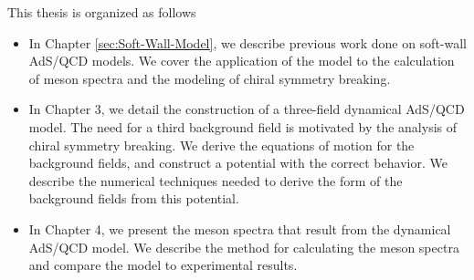 This thesis is organized as follows
\begin{itemize}

\item In Chapter \ref{sec:Soft-Wall-Model}, we describe previous work done on soft-wall AdS/QCD models. 
We cover the application of the model to the calculation of meson spectra and the modeling of chiral symmetry breaking.

\item In Chapter 3, we detail the construction of a three-field dynamical AdS/QCD model.
The need for a third background field is motivated by the analysis of chiral symmetry breaking. 
We derive the equations of motion for the background fields, and construct a potential with the correct behavior.
We describe the numerical techniques needed to derive the form of the background fields from this potential.

\item In Chapter 4, we present the meson spectra that result from the dynamical AdS/QCD model.
We describe the method for calculating the meson spectra and compare the model to experimental results. 


\end{itemize}
